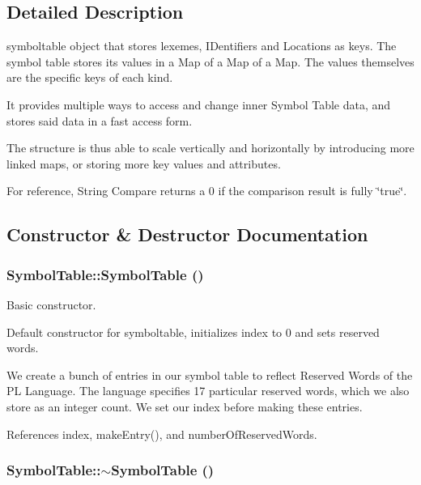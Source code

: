 \subsection{Detailed Description}
symboltable object that stores lexemes, IDentifiers and Locations as keys. The symbol table stores its values in a Map of a Map of a Map. The values themselves are the specific keys of each kind.

It provides multiple ways to access and change inner Symbol Table data, and stores said data in a fast access form.

The structure is thus able to scale vertically and horizontally by introducing more linked maps, or storing more key values and attributes.

For reference, String Compare returns a 0 if the comparison result is fully \char`\"{}true\char`\"{}. 

\subsection{Constructor \& Destructor Documentation}
\hypertarget{classSymbolTable_a1fbe6cec5594463b766db0ac58c9aa1d}{
\subsubsection[{SymbolTable}]{\setlength{\rightskip}{0pt plus 5cm}SymbolTable::SymbolTable ()}}
\label{classSymbolTable_a1fbe6cec5594463b766db0ac58c9aa1d}


Basic constructor. 

Default constructor for symboltable, initializes index to 0 and sets reserved words.

We create a bunch of entries in our symbol table to reflect Reserved Words of the PL Language. The language specifies 17 particular reserved words, which we also store as an integer count. We set our index before making these entries. 

References index, makeEntry(), and numberOfReservedWords.

\hypertarget{classSymbolTable_a5d5ae9b5b22d87691cec9ec17cfff650}{
\subsubsection[{$\sim$SymbolTable}]{\setlength{\rightskip}{0pt plus 5cm}SymbolTable::$\sim$SymbolTable ()}}
\label{classSymbolTable_a5d5ae9b5b22d87691cec9ec17cfff650}


